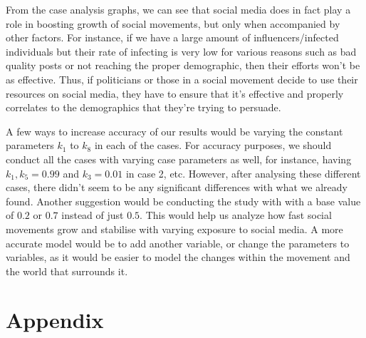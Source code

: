 \documentclass{article}
\begin{document}
    From the case analysis graphs, we can see that social media does in fact play a role in boosting growth of social movements, but only when accompanied by other factors. For instance, if we have a large amount of influencers/infected individuals but their rate of infecting is very low for various reasons such as bad quality posts or not reaching the proper demographic, then their efforts won't be as effective. Thus, if politicians or those in a social movement decide to use their resources on social media, they have to ensure that it's effective and properly correlates to the demographics that they're trying to persuade. 

    A few ways to increase accuracy of our results would be varying the constant parameters $k_1$ to $k_8$ in each of the cases. For accuracy purposes, we should conduct all the cases with varying case parameters as well, for instance, having $k_1,k_5 = 0.99$ and $k_3 = 0.01$ in case 2, etc. However, after analysing these different cases, there didn't seem to be any significant differences with what we already found. Another suggestion would be conducting the study with with a base value of $0.2$ or $0.7$ instead of just $0.5$. This would help us analyze how fast social movements grow and stabilise with varying exposure to social media. A more accurate model would be to add another variable, or change the parameters to variables, as it would be easier to model the changes within the movement and the world that surrounds it.

    \newpage
    
    
    \section{Appendix}
\end{document}
